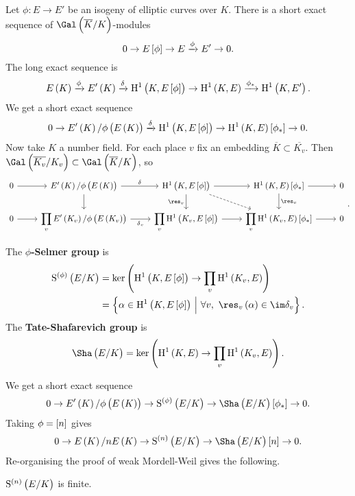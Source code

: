 Let $ \phi : E \to E' $ be an isogeny of elliptic curves over $ K $. There is a short exact sequence of $ \Gal\br{\overline{K} / K} $-modules
$$ 0 \to E\sbr{\phi} \to E \xrightarrow{\phi} E' \to 0. $$
The long exact sequence is
$$ E\br{K} \xrightarrow{\phi} E'\br{K} \xrightarrow{\delta} \H^1\br{K, E\sbr{\phi}} \to \H^1\br{K, E} \xrightarrow{\phi_*} \H^1\br{K, E'}. $$
We get a short exact sequence
$$ 0 \to E'\br{K} / \phi\br{E\br{K}} \xrightarrow{\delta} \H^1\br{K, E\sbr{\phi}} \to \H^1\br{K, E}\sbr{\phi_*} \to 0. $$
Now take $ K $ a number field. For each place $ v $ fix an embedding $ \overline{K} \subset \overline{K_v} $. Then $ \Gal\br{\overline{K_v} / K_v} \subset \Gal\br{\overline{K} / K} $, so
$$
\begin{tikzcd}
0 \arrow{r} & E'\br{K} / \phi\br{E\br{K}} \arrow{r}{\delta} \arrow{d} & \H^1\br{K, E\sbr{\phi}} \arrow{r} \arrow{d}[swap]{\res_v} \arrow[dashed]{dr} & \H^1\br{K, E}\sbr{\phi_*} \arrow{r} \arrow{d}{\res_v} & 0 \\
0 \arrow{r} & \displaystyle\prod_v E'\br{K_v} / \phi\br{E\br{K_v}} \arrow{r}[swap]{\delta_v} & \displaystyle\prod_v \H^1\br{K_v, E\sbr{\phi}} \arrow{r} & \displaystyle\prod_v \H^1\br{K_v, E}\sbr{\phi_*} \arrow{r} & 0
\end{tikzcd}.
$$

\begin{definition*}
The \textbf{$ \phi $-Selmer group} is
\begin{align*}
\S^{\br{\phi}}\br{E / K}
& = \ker \br{\H^1\br{K, E\sbr{\phi}} \to \prod_v \H^1\br{K_v, E}} \\
& = \cbr{\alpha \in \H^1\br{K, E\sbr{\phi}} \st \forall v, \ \res_v\br{\alpha} \in \im \delta_v}.
\end{align*}
The \textbf{Tate-Shafarevich group} is
$$ \Sha\br{E / K} = \ker \br{\H^1\br{K, E} \to \prod_v \H^1\br{K_v, E}}. $$
\end{definition*}

We get a short exact sequence
$$ 0 \to E'\br{K} / \phi\br{E\br{K}} \to \S^{\br{\phi}}\br{E / K} \to \Sha\br{E / K}\sbr{\phi_*} \to 0. $$
Taking $ \phi = \sbr{n} $ gives
$$ 0 \to E\br{K} / nE\br{K} \to \S^{\br{n}}\br{E / K} \to \Sha\br{E / K}\sbr{n} \to 0. $$
Re-organising the proof of weak Mordell-Weil gives the following.

\begin{theorem}
$ \S^{\br{n}}\br{E / K} $ is finite.
\end{theorem}

